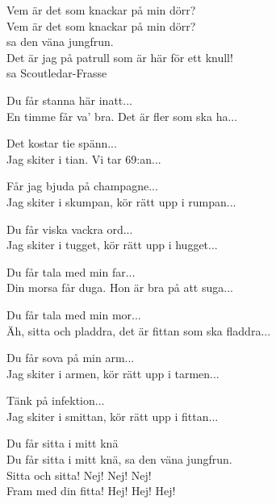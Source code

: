 \vspace{10pt}
\revrpt Vem är det som knackar på min dörr?\rpt\\
Vem är det som knackar på min dörr?\\
sa den väna jungfrun.\\
\revrpt Det är jag på patrull som är här för ett knull!\\
sa Scoutledar-Frasse\rpt\par
\vspace{10pt}
Du får stanna här inatt...\\
En timme får va' bra. Det är fler som ska ha...\par
\vspace{10pt}
Det kostar tie spänn...\\
Jag skiter i tian. Vi tar 69:an...\par
\vspace{10pt}
Får jag bjuda på champagne...\\
Jag skiter i skumpan, kör rätt upp i rumpan...\par
\vspace{10pt}
Du får viska vackra ord...\\
Jag skiter i tugget, kör rätt upp i hugget...\par
\vspace{10pt}
Du får tala med min far...\\
Din morsa får duga. Hon är bra på att suga...\par
\vspace{10pt}
Du får tala med min mor...\\
Äh, sitta och pladdra, det är fittan som ska fladdra...\par
\vspace{10pt}
Du får sova på min arm...\\
Jag skiter i armen, kör rätt upp i tarmen...\par
\vspace{10pt}
Tänk på infektion...\\
Jag skiter i smittan, kör rätt upp i fittan...\par
\vspace{10pt}
\revrpt Du får sitta i mitt knä\rpt\\
Du får sitta i mitt knä, sa den väna jungfrun.\\
Sitta och sitta! Nej! Nej! Nej!\\
Fram med din fitta! Hej! Hej! Hej!
